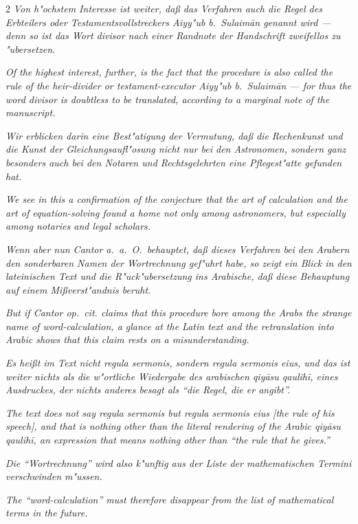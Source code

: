 \documentclass[10pt,a4paper]{article}
\newcommand{\enquote}[1]{``#1''}
\begin{document}
\begin{paracol}{2}
\textit{Von h"ochstem Interesse ist weiter, da\ss{} das Verfahren auch die Regel des Erbteilers oder Testamentsvollstreckers Aiyy"ub b.\ Sulaim\=an genannt wird --- denn so ist das Wort \textit{divisor} nach einer Randnote der Handschrift zweifellos zu "ubersetzen.}

\switchcolumn

\textit{Of the highest interest, further, is the fact that the procedure is also called the rule of the heir-divider or testament-executor Aiyy"ub b.\ Sulaim\=an --- for thus the word \textit{divisor} is doubtless to be translated, according to a marginal note of the manuscript.}

\switchcolumn*

\textit{Wir erblicken darin eine Best"atigung der Vermutung, da\ss{} die Rechenkunst und die Kunst der Gleichungsaufl"osung nicht nur bei den Astronomen, sondern ganz besonders auch bei den Notaren und Rechtsgelehrten eine Pflegest"atte gefunden hat.}

\switchcolumn

\textit{We see in this a confirmation of the conjecture that the art of calculation and the art of equation-solving found a home not only among astronomers, but especially among notaries and legal scholars.}

\switchcolumn*

\textit{Wenn aber nun Cantor a.\ a.\ O.\ behauptet, da\ss{} dieses Verfahren bei den Arabern den sonderbaren Namen der Wortrechnung gef"uhrt habe, so zeigt ein Blick in den lateinischen Text und die R"uck"ubersetzung ins Arabische, da\ss{} diese Behauptung auf einem Mi\ss{}verst"andnis beruht.}

\switchcolumn

\textit{But if Cantor \textit{op.\ cit.} claims that this procedure bore among the Arabs the strange name of word-calculation, a glance at the Latin text and the retranslation into Arabic shows that this claim rests on a misunderstanding.}

\switchcolumn*

\textit{Es hei\ss{}t im Text nicht \textit{regula sermonis}, sondern \textit{regula sermonis eius}, und das ist weiter nichts als die w"ortliche Wiedergabe des arabischen \textit{qiy\=asu qaulih\={i}}, eines Ausdruckes, der nichts anderes besagt als \enquote{die Regel, die er angibt}.}

\switchcolumn

\textit{The text does not say \textit{regula sermonis} but \textit{regula sermonis eius} [the rule of his speech], and that is nothing other than the literal rendering of the Arabic \textit{qiy\=asu qaulih\={i}}, an expression that means nothing other than \enquote{the rule that he gives.}}

\switchcolumn*

\textit{Die \enquote{Wortrechnung} wird also k"unftig aus der Liste der mathematischen Termini verschwinden m"ussen.}

\switchcolumn

\textit{The \enquote{word-calculation} must therefore disappear from the list of mathematical terms in the future.}

\end{paracol}
\end{document}
